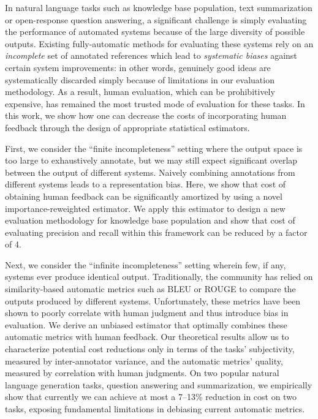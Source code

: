 In natural language tasks such as knowledge base population, text summarization or open-response question answering, a significant challenge is simply evaluating the performance of automated systems because of the large diversity of possible outputs.
Existing fully-automatic methods for evaluating these systems rely on an \textit{incomplete} set of annotated references which lead to \textit{systematic biases} against certain system improvements: in other words, genuinely good ideas are systematically discarded simply because of limitations in our evaluation methodology.
As a result, human evaluation, which can be prohibitively expensive, has remained the most trusted mode of evaluation for these tasks.
In this work, we show how one can decrease the costs of incorporating human feedback through the design of appropriate statistical estimators. 
%

First, we consider the ``finite incompleteness'' setting where the output space is too large to exhaustively annotate, but we may still expect significant overlap between the output of different systems. 
Naively combining annotations from different systems leads to a representation bias.
Here, we show that cost of obtaining human feedback can be significantly amortized by using a novel importance-reweighted estimator.  
We apply this estimator to design a new evaluation methodology for knowledge base population and show that cost of evaluating precision and recall within this framework can be reduced by a factor of 4.

Next, we consider the ``infinite incompleteness'' setting wherein few, if any, systems ever produce identical output.
Traditionally, the community has relied on similarity-based automatic metrics such as BLEU or ROUGE to compare the outputs produced by different systems.
Unfortunately, these metrics have been shown to poorly correlate with human judgment and thus introduce bias in evaluation.
We derive an unbiased estimator that optimally combines these automatic metrics with human feedback.
Our theoretical results allow us to characterize potential cost reductions only in terms of the tasks' subjectivity, measured by inter-annotator variance, and the automatic metrics' quality, measured by correlation with human judgments.
On two popular natural language generation tasks, question answering and summarization, we empirically show that currently we can achieve at most a 7--13\% reduction in cost on two tasks, exposing fundamental limitations in debiasing current automatic metrics.

